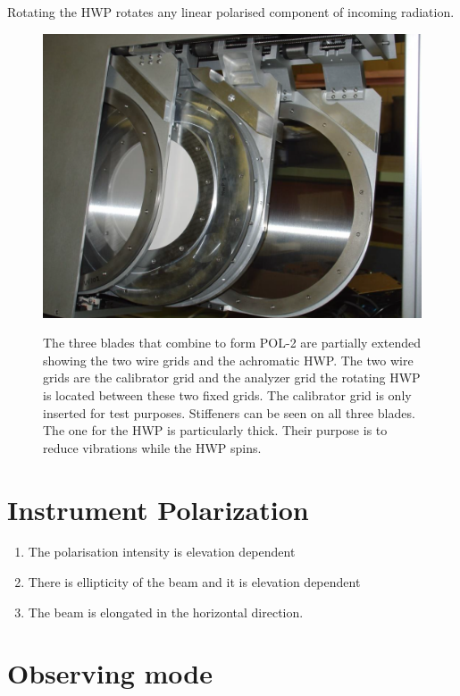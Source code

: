 Rotating the HWP rotates any linear polarised component of incoming radiation.



\begin{figure}[t!]
\begin{center}
\includegraphics[width=0.7\linewidth]{pol2-three-components.png}
\label{fig:pol2components}
\caption [POL-2 components]{
  \small The three blades that combine to form POL-2 are partially
  extended showing the two wire grids and the achromatic HWP.
  The two wire grids are the calibrator grid and the analyzer grid
  the rotating HWP is located between these two fixed grids.
  The calibrator grid is only inserted for test purposes.
  Stiffeners can be seen on all three blades. The one for the HWP 
  is particularly thick. Their purpose is to reduce vibrations while
  the HWP spins.
}
\end{center}
\end{figure}



\section{Instrument Polarization}

\begin{enumerate}\itemsep-0.2em
\item The polarisation intensity is elevation dependent
\item There is ellipticity of the beam and it is elevation dependent
\item The beam is elongated in the horizontal direction.
\end{enumerate}


\section{Observing mode}
\label{sec:mmodes}

